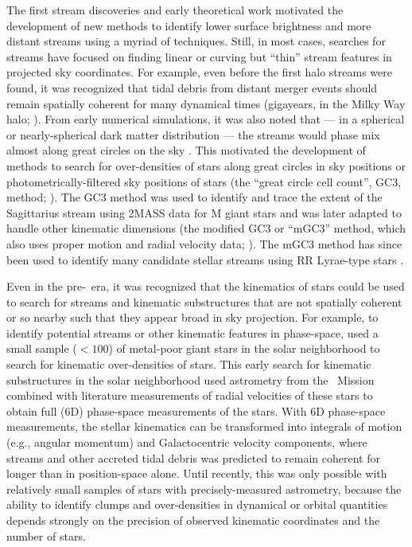 \documentclass[final,5p,times,twocolumn,authoryear]{elsarticle}
\begin{document}
The first stream discoveries and early theoretical work motivated the development of
new methods to identify lower surface brightness and more distant streams using a myriad
of techniques.
Still, in most cases, searches for streams have focused on finding linear or curving but
``thin'' stream features in projected sky coordinates.
For example, even before the first halo streams were found, it was recognized that tidal
debris from distant merger events should remain spatially coherent for many dynamical
times (gigayears, in the Milky Way halo; \citealt{Johnston:199X, Helmi:1999}).
From early numerical simulations, it was also noted that --- in a spherical or
nearly-spherical dark matter distribution --- the streams would phase mix almost along
great circles on the sky \citep{Johnston:1996, others}.
This motivated the development of methods to search for over-densities of stars along
great circles in sky positions or photometrically-filtered sky positions of stars (the
``great circle cell count'', GC3, method; \citealt{Johnston:1996}).
The GC3 method was used to identify and trace the extent of the Sagittarius stream using
2MASS data for M giant stars \citep{Majewski:2003} and was later adapted to handle other
kinematic dimensions (the modified GC3 or ``mGC3'' method, which also uses proper motion
and radial velocity data; \citealt{Mateu:2011}).
The mGC3 method has since been used to identify many candidate stellar streams using RR
Lyrae-type stars \citep{Mateu:2018}.

Even in the pre-\gaia\ era, it was recognized that the kinematics of stars could be used
to search for streams and kinematic substructures that are not spatially coherent or so
nearby such that they appear broad in sky projection.
For example, to identify potential streams or other kinematic features in
phase-space, \citet{Helmi:1999} used a small sample ($<100$) of metal-poor giant stars
in the solar neighborhood to search for kinematic over-densities of stars.
This early search for kinematic substructures in the solar neighborhood used astrometry
from the \hipparcos\ Mission \citep{todo} combined with literature measurements of
radial velocities of these stars to obtain full (6D) phase-space measurements of the
stars.
With 6D phase-space measurements, the stellar kinematics can be transformed into
integrals of motion (e.g., angular momentum) and Galactocentric velocity components,
where streams and other accreted tidal debris was predicted to remain coherent for
longer than in position-space alone.
Until recently, this was only possible with relatively small samples of stars with
precisely-measured astrometry, because the ability to identify clumps and over-densities
in dynamical or orbital quantities depends strongly on the precision of observed
kinematic coordinates and the number of stars.
\end{document}
